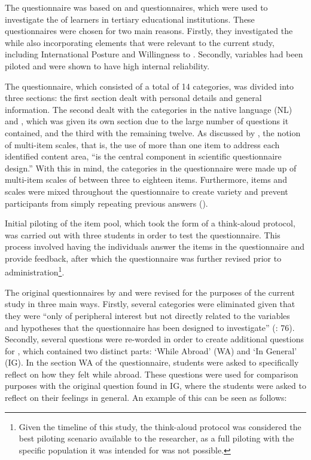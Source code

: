 \documentclass[output=paper]{langsci/langscibook}
\begin{document}
The questionnaire was based on  and  questionnaires, which were used to investigate the  of  learners in tertiary educational institutions. These questionnaires were chosen for two main reasons. Firstly, they investigated the  while also incorporating elements that were relevant to the current study, including International Posture and Willingness to . Secondly, variables had been piloted and were shown to have high internal reliability. 

The questionnaire, which consisted of a total of 14 categories, was divided into three sections: the first section dealt with personal details and general information. The second dealt with the categories  in the native language (NL) and , which was given its own section due to the large number of questions it contained, and the third with the remaining twelve. As discussed by  \citet[76]{DörnyeiCsizér2012}, the notion of multi-item scales, that is, the use of more than one item to address each identified content area, “is the central component in scientific questionnaire design.” With this in mind, the categories in the questionnaire were made up of multi-item scales of between three to eighteen items. Furthermore, items and scales were mixed throughout the questionnaire to create variety and prevent participants from simply repeating previous answers (\citealt{DörnyeiCsizér2012}).

Initial piloting of the item pool, which took the form of a think-aloud protocol, was carried out with three students in order to test the questionnaire. This process involved having the individuals answer the items in the questionnaire and provide feedback, after which the questionnaire was further revised prior to administration\footnote{Given the timeline of this study, the think-aloud protocol was considered the best piloting scenario available to the researcher, as a full piloting with the specific population it was intended for was not possible.}.

The original questionnaires by \citet{Ryan2009} and \citet{Yashima2009} were revised for the purposes of the current study in three main ways. Firstly, several categories were eliminated given that they were “only of peripheral interest but not directly related to the variables and hypotheses that the questionnaire has been designed to investigate” (\citealt{DörnyeiCsizér2012}: 76). Secondly, several questions were re-worded in order to create additional questions for , which contained two distinct parts: ‘While  {Abroad}’ (WA) and ‘In General’ (IG). In the section WA of the questionnaire, students were asked to specifically reflect on how they felt while abroad. These questions were used for comparison purposes with the original question found in  IG, where the students were asked to reflect on their feelings in general. An example of this can be seen as follows:
\end{document}
